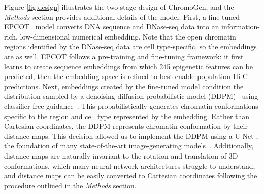 \documentclass[12pt,letterpaper]{article}
\begin{document}
Figure \ref{fig:design} illustrates the two-stage design of ChromoGen, and the \emph{Methods} section provides additional details of the model. First, a fine-tuned EPCOT~\cite{Zhang2023a} model converts DNA sequence and DNase-seq data into an information-rich, low-dimensional numerical embedding. 
Note that the open chromatin regions identified by the DNase-seq data are cell type-specific, so the embeddings are as well. 
EPCOT follows a pre-training and fine-tuning framework: %
it first learns to create sequence embeddings from which 245 epigenetic features can be predicted, then the embedding space is refined to best enable population Hi-C predictions. 
Next, embeddings created by the fine-tuned model condition the distribution sampled by a denoising diffusion probabilistic model (DDPM)~\cite{Ho2020} using classifier-free guidance~\cite{Ho2022a}. 
This probabilistically generates chromatin conformations specific to the region and cell type represented by the embedding. 
Rather than Cartesian coordinates, the DDPM represents chromatin conformation by their distance maps. 
This decision allowed us to implement the DDPM using a U-Net \cite{ronneberger2015UNet}, the foundation of many state-of-the-art image-generating models~\cite{Dhariwal2021, Saharia2022, rombach_high-resolution_2022}.
Additionally, distance maps are naturally invariant to the rotation and translation of 3D conformations, which many neural network architectures struggle to understand, and distance maps can be easily converted to Cartesian coordinates following the procedure outlined in the \emph{Methods} section.
\end{document}
